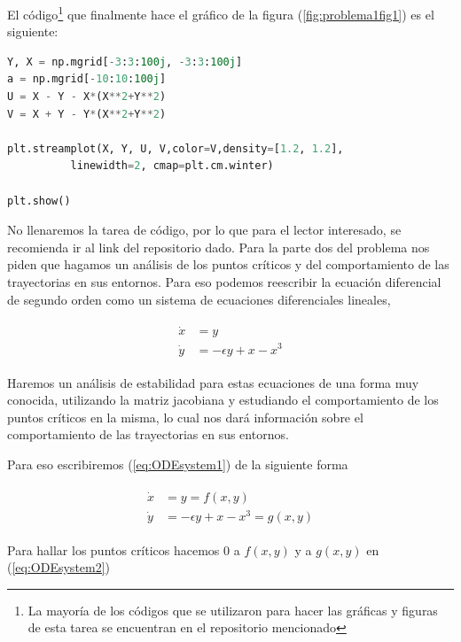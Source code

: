 \documentclass[a4paper,10pt]{article}
\numberwithin{equation}{section}
\begin{document}
El código\footnote{La mayoría de los códigos que se utilizaron para hacer
las gráficas y figuras de esta tarea se encuentran en el repositorio 
mencionado} que finalmente hace el gráfico de la figura (\ref{fig:problema1fig1}) es el siguiente:

\begin{lstlisting}[language=Python]
Y, X = np.mgrid[-3:3:100j, -3:3:100j]
a = np.mgrid[-10:10:100j]
U = X - Y - X*(X**2+Y**2)
V = X + Y - Y*(X**2+Y**2)

plt.streamplot(X, Y, U, V,color=V,density=[1.2, 1.2], 
	      linewidth=2, cmap=plt.cm.winter)

plt.show()
\end{lstlisting}

No llenaremos la tarea de código, por lo que para el lector interesado, se recomienda
ir al link del repositorio dado. Para la parte dos del problema nos piden que hagamos un análisis de los puntos críticos
y del comportamiento de las trayectorias en sus entornos. Para eso podemos reescribir
la ecuación diferencial de segundo orden como un sistema de ecuaciones diferenciales
lineales,


\begin{align}
 \begin{split}
  \dot{x} &= y \\
  \dot{y} &= - \epsilon y + x - x^3
 \end{split}
 \label{eq:ODEsystem1}
\end{align}

Haremos un análisis de estabilidad para estas ecuaciones de una forma muy conocida, utilizando
la matriz jacobiana y estudiando el comportamiento de los puntos críticos en la misma,
lo cual nos dará información sobre el comportamiento de las trayectorias en sus entornos.

\vspace{.3cm}

Para eso escribiremos (\ref{eq:ODEsystem1}) de la siguiente forma

\begin{align}
 \begin{split}
  \dot{x} &= y = f(x,y)\\
  \dot{y} &= - \epsilon y + x - x^3 = g(x,y)
 \end{split}
 \label{eq:ODEsystem2}
\end{align}

Para hallar los puntos críticos hacemos $0$ a $f(x,y)$ y a $g(x,y)$ en (\ref{eq:ODEsystem2})
\end{document}

